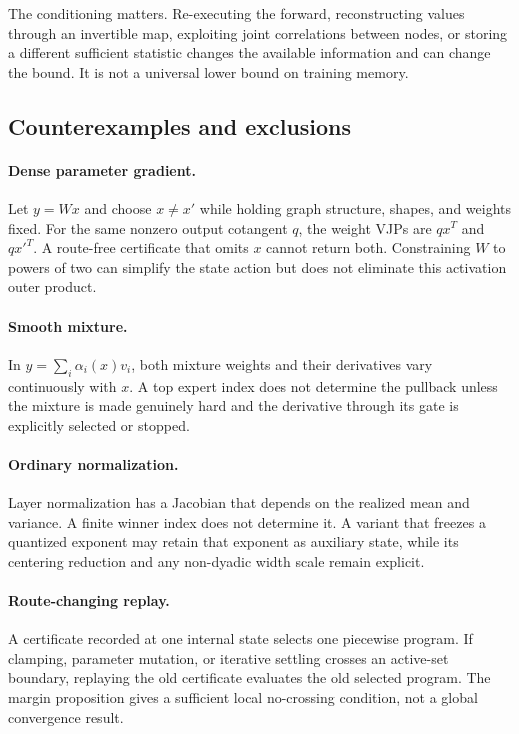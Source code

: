 The conditioning matters.  Re-executing the forward, reconstructing values
through an invertible map, exploiting joint correlations between nodes, or
storing a different sufficient statistic changes the available information and
can change the bound.  It is not a universal lower bound on training memory.

\subsection{Counterexamples and exclusions}

\paragraph{Dense parameter gradient.}
Let $y=Wx$ and choose $x\ne x'$ while holding graph structure, shapes, and
weights fixed.  For the same nonzero output cotangent $q$, the weight VJPs are
$qx^T$ and $q{x'}^T$.  A route-free certificate that omits $x$ cannot return
both.  Constraining $W$ to powers of two can simplify the state action but does
not eliminate this activation outer product.

\paragraph{Smooth mixture.}
In $y=\sum_i\alpha_i(x)v_i$, both mixture weights and their derivatives vary
continuously with $x$.  A top expert index does not determine the pullback
unless the mixture is made genuinely hard and the derivative through its gate
is explicitly selected or stopped.

\paragraph{Ordinary normalization.}
Layer normalization has a Jacobian that depends on the realized mean and
variance.  A finite winner index does not determine it.  A variant that freezes
a quantized exponent may retain that exponent as auxiliary state, while its
centering reduction and any non-dyadic width scale remain explicit.

\paragraph{Route-changing replay.}
A certificate recorded at one internal state selects one piecewise program.
If clamping, parameter mutation, or iterative settling crosses an active-set
boundary, replaying the old certificate evaluates the old selected program.
The margin proposition gives a sufficient local no-crossing condition, not a
global convergence result.

